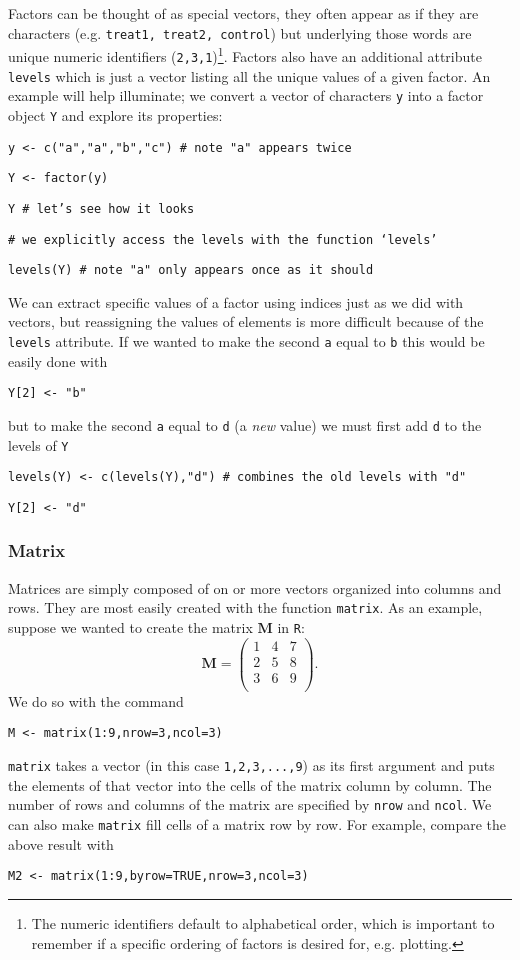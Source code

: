 \documentclass[12pt]{article}
\newcommand{\R}[1] {
	\item \texttt{#1}
}
\newenvironment{verbatim}{ 
	\indent
	\begin{list}{}{\setlength{\itemsep}{-1.5mm}}
}{
	\end{list}
}
\begin{document}
Factors can be thought of as special vectors, they often appear as if they are characters (e.g. \verb+treat1, treat2, control+) but underlying those words are unique numeric identifiers (\verb+2,3,1+)\footnote{The numeric identifiers default to alphabetical order, which is important to remember if a specific ordering of factors is desired for, e.g. plotting.}.  Factors also have an additional attribute \verb+levels+ which is just a vector listing all the unique values of a given factor.  An example will help illuminate; we convert a vector of characters \verb+y+ into a factor object \verb+Y+ and explore its properties:
\begin{verbatim}
	\R{y <- c("a","a","b","c")	\# note "a" appears twice}
	\R{Y <- factor(y)}
	\R{Y	\# let's see how it looks}
	\R{\# we explicitly access the levels with the function `levels'}
	\R{levels(Y)	\# note "a" only appears once as it should}
\end{verbatim}
We can extract specific values of a factor using indices just as we did with vectors, but reassigning the values of elements is more difficult because of the \verb+levels+ attribute.  If we wanted to make the second \verb+a+ equal to \verb+b+ this would be easily done with
\begin{verbatim}
	\R{Y[2] <- "b"}
\end{verbatim}
but to make the second \verb+a+ equal to \verb+d+ (a \emph{new} value) we must first add \verb+d+ to the levels of \verb+Y+
\begin{verbatim}
	\R{levels(Y) <- c(levels(Y),"d")	\# combines the old levels with "d" }
	\R{Y[2] <- "d"}
\end{verbatim}

\subsubsection{Matrix}	\label{sec:matrix}
Matrices are simply composed of on or more vectors organized into columns and rows.  They are most easily created with the function \verb+matrix+.  As an example, suppose we wanted to create the matrix $\mathbf{M}$ in \verb+R+:
\begin{equation*}
	\mathbf{M} = \left(
		\begin{array}{ccc}
			1	&	4	&	7	\\
			2	&	5	&	8	\\
			3	&	6	&	9	\\
		\end{array}
	\right).
\end{equation*}
We do so with the command
\begin{verbatim}
	\R{M <- matrix(1:9,nrow=3,ncol=3)}
\end{verbatim}
\verb+matrix+ takes a vector (in this case \verb+1,2,3,...,9+) as its first argument and puts the elements of that vector into the cells of the matrix column by column.  The number of rows and columns of the matrix are specified by \verb+nrow+ and \verb+ncol+.  We can also make \verb+matrix+ fill cells of a matrix row by row.  For example, compare the above result with
\begin{verbatim}
	\R{M2 <- matrix(1:9,byrow=TRUE,nrow=3,ncol=3)}
\end{verbatim}
\end{document}
